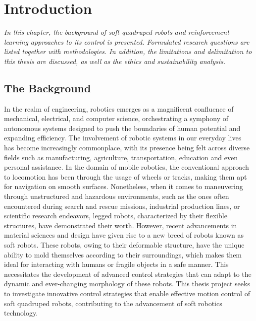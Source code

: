 \chapter{Introduction}
\label{chap1}
\textit{In this chapter, the background of soft quadruped robots and reinforcement learning approaches to its control is presented. Formulated research questions are listed together with methodologies. In addition, the limitations and delimitation to this thesis are discussed, as well as the ethics and sustainability analysis.}

\section{The Background}
In the realm of engineering, robotics emerges as a magnificent confluence of mechanical, electrical, and computer science, orchestrating a symphony of autonomous systems designed to push the boundaries of human potential and expanding efficiency\cite{billard2019Trends}. The involvement of robotic systems in our everyday lives has become increasingly commonplace, with its presence being felt across diverse fields such as manufacturing\cite{wang2018Current}, agriculture\cite{li2023Development}, transportation\cite{zhang2023Finding}, education\cite{riedo2013Thymio} and even personal assistance\cite{openai2023GPT4}. In the domain of mobile robotics, the conventional approach to locomotion has been through the usage of wheels or tracks, making them apt for navigation on smooth surfaces\cite{li2011Research}. Nonetheless, when it comes to maneuvering through unstructured and hazardous environments, such as the ones often encountered during search and rescue missions\cite{hawkes2017Soft}, industrial production lines\cite{hu2021Design}, or scientific research endeavors\cite{hewing2020Learningbased}, legged robots, characterized by their flexible structures, have demonstrated their worth. However, recent advancements in material sciences and design have given rise to a new breed of robots known as soft robots. These robots, owing to their deformable structure, have the unique ability to mold themselves according to their surroundings, which makes them ideal for interacting with humans or fragile objects in a safe manner\cite{muralidharan2021Soft}. This necessitates the development of advanced control strategies that can adapt to the dynamic and ever-changing morphology of these robots\cite{wang2022Control}. This thesis project seeks to investigate innovative control strategies that enable effective motion control of soft quadruped robots, contributing to the advancement of soft robotics technology.
